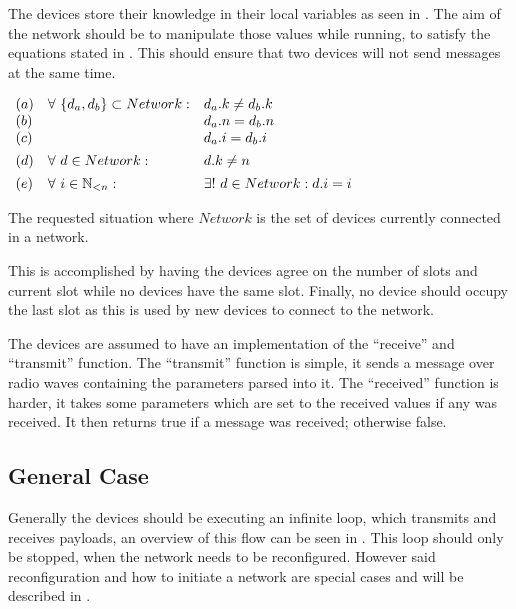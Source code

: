 The devices store their knowledge in their local variables as seen in . 
The aim of the network should be to manipulate those values while running, to satisfy the equations stated in . 
This should ensure that two devices will not send messages at the same time.

\begin{table}[H]
	\centering
	$\begin{array}{l l l}
		(a)&\forall\ \{d_a, d_b\} \subset Network: & d_a.k \neq d_b.k \\
		(b)&& d_a.n = d_b.n \\
		(c)&& d_a.i = d_b.i \\[1ex]
		(d)&\forall\ d \in Network: & d.k \neq n \\[1ex]
		(e)&\forall\ i \in \mathbb{N}_{<n}: & \exists!\ d \in Network: d.i = i 
	\end{array}$
	\caption{The requested situation where $Network$ is the set of devices currently connected in a network.}
    \label{tab:invariants}
\end{table}

This is accomplished by having the devices agree on the number of slots and current slot while no devices have the same slot. 
Finally, no device should occupy the last slot as this is used by new devices to connect to the network.

The devices are assumed to have an implementation of the \enquote{receive} and \enquote{transmit} function.
The \enquote{transmit} function is simple, it sends a message over radio waves containing the parameters parsed into it.
The \enquote{received} function is harder, it takes some parameters which are set to the received values if any was received. 
It then returns true if a message was received; otherwise false.
                    
\subsection{General Case} %
\label{sub:general_case}
Generally the devices should be executing an infinite loop, which transmits and receives payloads, an overview of this flow can be seen in .
This loop should only be stopped, when the network needs to be reconfigured.
However said reconfiguration and how to initiate a network are special cases and will be described in .


